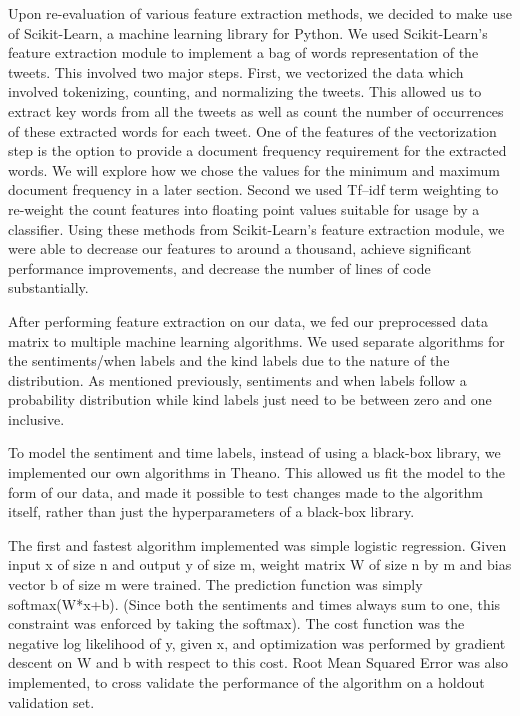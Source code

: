 \documentclass{article}
\begin{document}
Upon re-evaluation of various feature extraction methods, we decided to make use of Scikit-Learn, a machine learning library for Python. We used Scikit-Learn's feature extraction module to implement a bag of words representation of the tweets. This involved two major steps. First, we vectorized the data which involved tokenizing, counting, and normalizing the tweets. This allowed us to extract key words from all the tweets as well as count the number of occurrences of these extracted words for each tweet. One of the features of the vectorization step is the option to provide a document frequency requirement for the extracted words. We will explore how we chose the values for the minimum and maximum document frequency in a later section. Second we used Tf–idf term weighting to re-weight the count features into floating point values suitable for usage by a classifier. Using these methods from Scikit-Learn's feature extraction module, we were able to decrease our features to around a thousand, achieve significant performance improvements, and decrease the number of lines of code substantially.


After performing feature extraction on our data, we fed our preprocessed data matrix to multiple machine learning algorithms. We used separate algorithms for the sentiments/when labels and the kind labels due to the nature of the distribution. As mentioned previously, sentiments and when labels follow a probability distribution while kind labels just need to be between zero and one inclusive.

To model the sentiment and time labels, instead of using a black-box library, we implemented our own algorithms in Theano. This allowed us fit the model to the form of our data, and made it possible to test changes made to the algorithm itself, rather than just the hyperparameters of a black-box library.

The first and fastest algorithm implemented was simple logistic regression. Given input x of size n and output y of size m, weight matrix W of size n by m and bias vector b of size m were trained. The prediction function was simply softmax(W*x+b). (Since both the sentiments and times always sum to one, this constraint was enforced by taking the softmax). The cost function was the negative log likelihood of y, given x, and optimization was performed by gradient descent on W and b with respect to this cost. Root Mean Squared Error was also implemented, to cross validate the performance of the algorithm on a holdout validation set.
\end{document}
